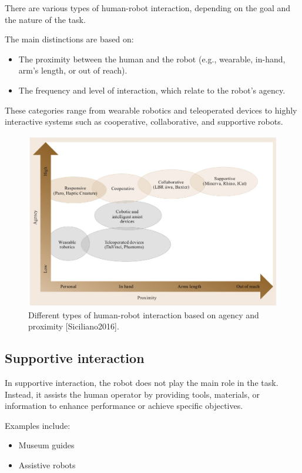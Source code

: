 There are various types of human-robot interaction, depending on the goal and the nature of the task.

The main distinctions are based on:
\begin{itemize}
  \item The proximity between the human and the robot (e.g., wearable, in-hand, arm's length, or out of reach).
  \item The frequency and level of interaction, which relate to the robot's agency.
\end{itemize}

These categories range from wearable robotics and teleoperated devices to highly interactive systems such as cooperative, collaborative, and supportive robots.

\begin{figure}[H]
  \centering
  \includegraphics[width=\linewidth]{imgs/hri_interaction_types.png}
  \caption{Different types of human-robot interaction based on agency and proximity [Siciliano2016].}
\end{figure}

\hfill

\subsection{Supportive interaction}

In supportive interaction, the robot does not play the main role in the task. Instead, it assists the human operator by providing tools, materials, or information to enhance performance or achieve specific objectives.

Examples include:
\begin{itemize}
  \item Museum guides
  \item Assistive robots
\end{itemize}

